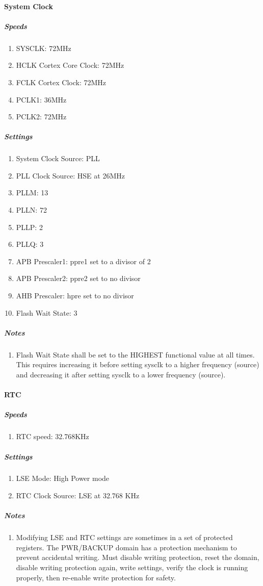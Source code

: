 \documentclass{scrreprt}
\begin{document}
	\paragraph{System Clock}
	\subparagraph{Speeds}
	\begin{enumerate}
		\item SYSCLK: 72MHz
		\item HCLK Cortex Core Clock: 72MHz
		\item FCLK Cortex Clock: 72MHz
		\item PCLK1: 36MHz
		\item PCLK2: 72MHz\label{PCLK2}
	\end{enumerate}
	\subparagraph{Settings}
	\begin{enumerate}
		\item System Clock Source: PLL
		\item PLL Clock Source: HSE at 26MHz
		\item PLLM: 13
		\item PLLN: 72
		\item PLLP: 2
		\item PLLQ: 3
		\item APB Prescaler1: ppre1 set to a divisor of 2
		\item APB Prescaler2: ppre2 set to no divisor
		\item AHB Prescaler: hpre set to no divisor
		\item Flash Wait State: 3
	\end{enumerate}
	\subparagraph{Notes}
	\begin{enumerate}
		\item Flash Wait State shall be set to the HIGHEST functional value at all times.  This requires increasing it before setting sysclk to a higher frequency (source) and decreasing it after setting sysclk to a lower frequency (source).
	\end{enumerate}
	\paragraph{RTC}
	\subparagraph{Speeds}
	\begin{enumerate}
		\item RTC speed: 32.768KHz
	\end{enumerate}
	\subparagraph{Settings}
	\begin{enumerate}
		\item LSE Mode: High Power mode
		\item RTC Clock Source: LSE at 32.768 KHz
	\end{enumerate}
	\subparagraph{Notes}
	\begin{enumerate}
		\item Modifying LSE and RTC settings are sometimes in a set of protected registers.  The PWR/BACKUP domain has a protection mechanism to prevent accidental writing.  Must disable writing protection, reset the domain, disable writing protection again, write settings, verify the clock is running properly, then re-enable write protection for safety.
	\end{enumerate}
\end{document}
